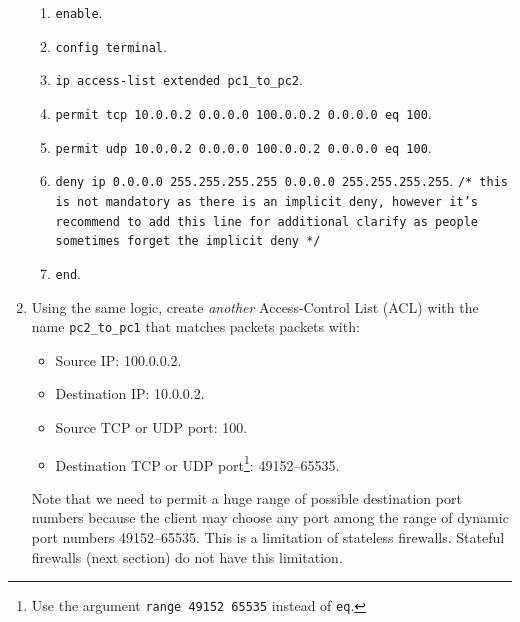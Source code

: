 \documentclass[pdftex,12pt,a4paper]{article}
\begin{document}
\begin{enumerate}
                        \begin{enumerate}
                            \item \texttt{enable}.
                            \item \texttt{config terminal}.
                            \item \texttt{ip access-list extended pc1\_to\_pc2}.
                            \item \texttt{permit tcp 10.0.0.2 0.0.0.0 100.0.0.2
                                0.0.0.0 eq 100}.
                            \item \texttt{permit udp 10.0.0.2 0.0.0.0 100.0.0.2
                                0.0.0.0 eq 100}.
                            \item \texttt{deny ip 0.0.0.0 255.255.255.255
                                0.0.0.0 255.255.255.255}. {\color{gray}
                                \texttt{/* this is not mandatory as there is an
                                implicit deny, however it's recommend to add this
                                line for additional clarify as people sometimes forget the
                                implicit deny */}}
                            \item \texttt{end}.
                        \end{enumerate}

                    \item Using the same logic, create \emph{another}
                        Access-Control List (ACL) with the name
                        \texttt{pc2\_to\_pc1} that matches packets packets
                        with:
                        \begin{itemize}
                            \item Source IP: 100.0.0.2.
                            \item Destination IP: 10.0.0.2.
                            \item Source TCP or UDP port: 100.
                            \item Destination TCP or UDP port\footnote{Use the
                                argument \texttt{range 49152 65535} instead of
                                \texttt{eq}.}: 49152--65535.
                        \end{itemize}

                        Note that we need to permit a huge range of possible
                        destination port numbers because the client may choose
                        any port among the range of dynamic port numbers
                        49152--65535. This is a limitation of stateless
                        firewalls. Stateful firewalls (next section) do not
                        have this limitation.


\end{enumerate}
\end{document}
